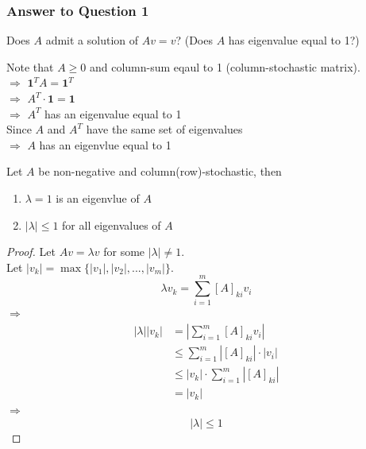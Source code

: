 \begin{multicols}{2}
\subsubsection{Answer to Question 1}
Does $A$ admit a solution of $Av=v$? (Does $A$ has eigenvalue equal to 1?)

Note that $A\geq 0$ and column-sum eqaul to 1 (column-stochastic matrix). \\
$\Longrightarrow$ $\textbf{1}^TA=\textbf{1}^T$ \\
$\Longrightarrow$ $A^T\cdot \textbf{1} = \textbf{1}$ \\
$\Longrightarrow$ $A^T$ has an eigenvalue equal to 1 \\
Since $A$ and $A^T$ have the same set of eigenvalues \\
$\Longrightarrow$ $A$ has an eigenvlue equal to 1 \\

\begin{theorem}
    Let $A$ be non-negative and column(row)-stochastic, then
    \begin{enumerate}
        \item $\lambda=1$ is an eigenvlue of $A$
        \item $|\lambda|\leq 1$ for all eigenvalues of $A$
    \end{enumerate}
\end{theorem}
\begin{proof}
    Let $Av = \lambda v$ for some $|\lambda|\neq 1$. \\
    Let $|v_k| = \max \{|v_1|,|v_2|,...,|v_m|\}$.
    \[
        \lambda v_k = \sum_{i=1}^m [A]_{ki}v_i
    \]
    $\Longrightarrow$
    \[
        \begin{array}{ll}
            |\lambda||v_k|  &= |\sum_{i=1}^m[A]_{ki}v_i| \\
                            &\leq \sum_{i=1}^m|[A]_{ki}|\cdot |v_i| \\
                            &\leq |v_k|\cdot \sum_{i=1}^m|[A]_{ki}| \\
                            &= |v_k|
        \end{array}
    \]
    $\Longrightarrow$
    \[
        |\lambda|\leq 1
    \]
\end{proof}


\end{multicols}
